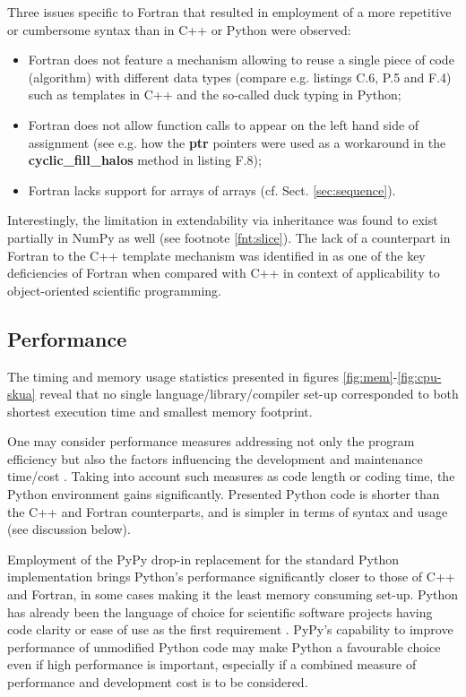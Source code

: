 \documentclass[gmd]{copernicus}%
\newcommand{\prog}[1]{{\rm\bf#1}}
\begin{document}
  Three issues specific to Fortran that 
    resulted in employment of a more repetitive or cumbersome syntax than in C++ or Python
    were observed:
  \begin{itemize}
    \item{Fortran does not feature a mechanism allowing to reuse a single piece of code (algorithm)
      with different data types (compare e.g. listings C.6, P.5 and F.4) such as
      templates in C++ and the so-called duck typing in Python;}
    \item{Fortran does not allow function calls to appear on the left hand side
      of assignment (see e.g. how the \prog{ptr} pointers were used as a workaround in the \prog{cyclic\_fill\_halos}
      method in listing F.8);}
    \item{Fortran lacks support for arrays of arrays (cf. Sect. \ref{sec:sequence}).}
  \end{itemize}
  Interestingly, the limitation in extendability via inheritance was found to
    exist partially in NumPy as well (see footnote \ref{fnt:slice}).
  The lack of a counterpart in Fortran to the C++ template mechanism was identified in
    \citep{Cary_et_al_1997}
    as one of the key deficiencies of Fortran when compared with C++ in context 
    of applicability to object-oriented scientific programming.

  \subsection{Performance}
  
  The timing and memory usage statistics presented in figures \ref{fig:mem}-\ref{fig:cpu-skua}
    reveal that no single language/library/compiler set-up 
    corresponded to both shortest execution time and smallest memory footprint.

  One may consider performance measures addressing not only the program efficiency but also 
    the factors influencing the development and maintenance time/cost 
    \citep[of particular importance in scientific computing,][]{Wilson_2006}.
  Taking into account such measures as code length or coding time,
    the Python environment gains significantly.
  Presented Python code is shorter than the C++ and Fortran counterparts,
    and is simpler in terms of syntax and usage (see discussion below).

  Employment of the PyPy drop-in replacement for the standard Python implementation brings 
    Python's performance significantly closer to those of C++ and Fortran, in some
    cases making it the least memory consuming set-up.
  Python has already been the language of choice for scientific software projects having code clarity 
    or ease of use as the first requirement \citep[see e.g.][]{Barnes_and_Jones_2011}.
  PyPy's capability to improve performance of unmodified Python code may 
    make Python a favourable choice even if high performance is important, especially
    if a combined measure of performance and development cost is to be considered. 
\end{document}
